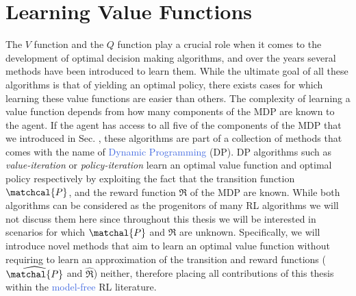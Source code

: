 \section{Learning Value Functions}
The $V$ function and the $Q$ function play a crucial role when it comes to the development of optimal decision making algorithms, and over the years several methods have been introduced to learn them. While the ultimate goal of all these algorithms is that of yielding an optimal policy, there exists cases for which learning these value functions are easier than others. The complexity of learning a value function depends from how many components of the MDP are known to the agent. If the agent has access to all five of the components of the MDP that we introduced in Sec. , these algorithms are part of a collection of methods that comes with the name of \textcolor{RoyalBlue}{Dynamic Programming} (DP). DP algorithms such as \textit{value-iteration} or \textit{policy-iteration} learn an optimal value function and optimal policy respectively by exploiting the fact that the transition function $\matchcal{P}$, and the reward function $\Re$ of the MDP are known. While both algorithms can be considered as the progenitors of many RL algorithms we will not discuss them here since throughout this thesis we will be interested in scenarios for which $\matchal{P}$ and $\Re$ are unknown. Specifically, we will introduce novel methods that aim to learn an optimal value function without requiring to learn an approximation of the transition and reward functions ($\widehat{\matchal{P}}$ and $\widehat{\mathcal{\Re}}$) neither, therefore placing all contributions of this thesis within the \textcolor{RoyalBlue}{model-free} RL literature. 

